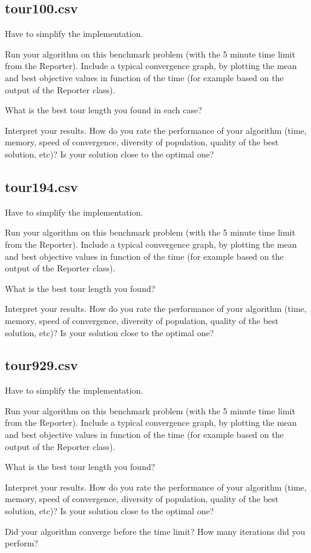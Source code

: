 \documentclass[a4paper,10pt]{article}
\newcommand{\ReplaceMe}[1]{{\color{blue}#1}}
\begin{document}
\subsection{tour100.csv}
Have to simplify the implementation.


\ReplaceMe{Run your algorithm on this benchmark problem (with the 5 minute time limit from the Reporter). Include a typical convergence graph, by plotting the mean and best objective values in function of the time (for example based on the output of the Reporter class). 

What is the best tour length you found in each case? 

Interpret your results. How do you rate the performance of your algorithm (time, memory, speed of convergence, diversity of population, quality of the best solution, etc)? Is your solution close to the optimal one?}

\subsection{tour194.csv}
Have to simplify the implementation.


\ReplaceMe{Run your algorithm on this benchmark problem (with the 5 minute time limit from the Reporter). Include a typical convergence graph, by plotting the mean and best objective values in function of the time (for example based on the output of the Reporter class). 

What is the best tour length you found? 

Interpret your results. How do you rate the performance of your algorithm (time, memory, speed of convergence, diversity of population, quality of the best solution, etc)? Is your solution close to the optimal one?}

\subsection{tour929.csv}
Have to simplify the implementation.


\ReplaceMe{Run your algorithm on this benchmark problem (with the 5 minute time limit from the Reporter). Include a typical convergence graph, by plotting the mean and best objective values in function of the time (for example based on the output of the Reporter class). 

What is the best tour length you found? 

Interpret your results. How do you rate the performance of your algorithm (time, memory, speed of convergence, diversity of population, quality of the best solution, etc)? Is your solution close to the optimal one? 

Did your algorithm converge before the time limit? How many iterations did you perform?}
\end{document}
